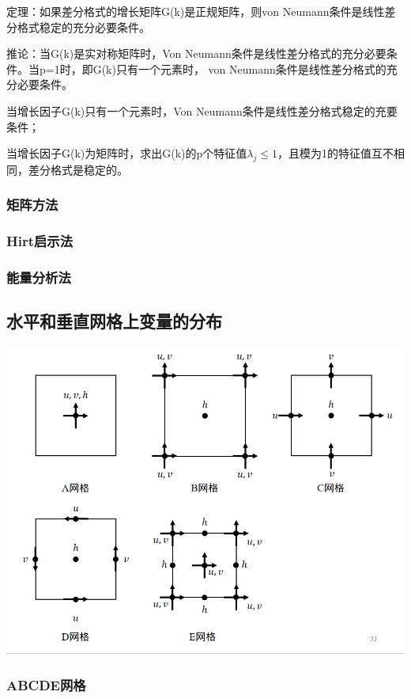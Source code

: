 \documentclass{article}
\begin{document}
定理：如果差分格式的增长矩阵G(k)是正规矩阵，则von Neumann条件是线性差分格式稳定的充分必要条件。

推论：当G(k)是实对称矩阵时，Von Neumann条件是线性差分格式的充分必要条件。当p=1时，即G(k)只有一个元素时， von Neumann条件是线性差分格式的充分必要条件。

当增长因子G(k)只有一个元素时，Von Neumann条件是线性差分格式稳定的充要条件；

当增长因子G(k)为矩阵时，求出G(k)的p个特征值$\lambda_j\le 1$，且模为1的特征值互不相同，差分格式是稳定的。

\subsubsection{矩阵方法}
\subsubsection{Hirt启示法}
\subsubsection{能量分析法}

\subsection{水平和垂直网格上变量的分布}
\begin{center}
        \includegraphics[width=\linewidth]{Fig3_3.png}
\end{center}

\subsubsection{ABCDE网格}
\end{document}

